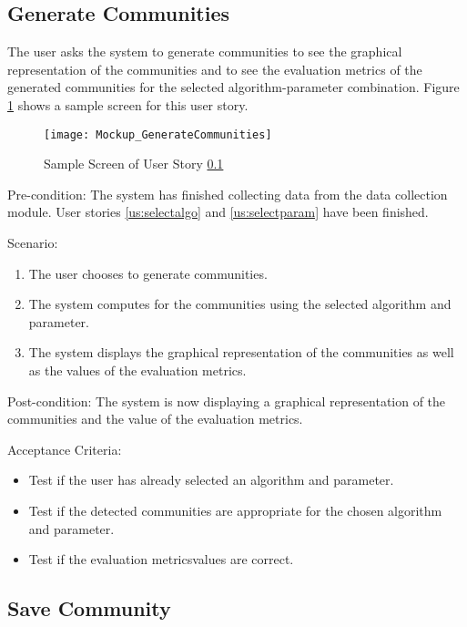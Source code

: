 \subsection{Generate Communities}
\label{us:gencom}




The user asks the system to generate communities to see the graphical representation of the communities and to see the 
evaluation metrics of the generated communities for the selected algorithm-parameter combination. Figure \ref{fig:gencom} shows a sample screen for this user story.


\begin{figure}[h]
	\centering
	\texttt{[image: Mockup\_GenerateCommunities]}
	\caption{Sample Screen of User Story \ref{us:gencom}}
	\label{fig:gencom}	
\end{figure}


Pre-condition: The system has finished collecting data from the data collection module. User stories \ref{us:selectalgo} and \ref{us:selectparam} have been finished.




Scenario:
\begin{enumerate}
	\item The user chooses to generate communities.
	\item The system computes for the communities using the selected algorithm and parameter.
	\item The system displays the graphical representation of the communities as well as the values of the evaluation metrics.
\end{enumerate}




Post-condition: The system is now displaying a graphical representation of the communities and the value of the evaluation
metrics.




Acceptance Criteria:
\begin{itemize}
	\item Test if the user has already selected an algorithm and parameter.
	\item Test if the detected communities are appropriate for the chosen algorithm and parameter.
	\item Test if the evaluation metrics\vtick values are correct.
\end{itemize}


\subsection{Save Community}
\label{us:savedat}




